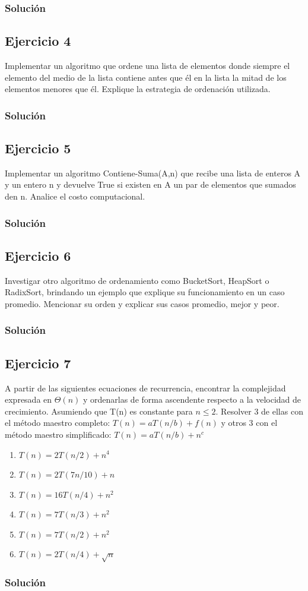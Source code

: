 \documentclass{article}
\begin{document}
\subsubsection*{Solución}


\subsection*{Ejercicio 4}
Implementar un algoritmo que ordene una lista de elementos donde siempre el elemento del medio de la lista contiene antes que él en la lista la mitad de los elementos menores que él. Explique la estrategia de ordenación utilizada.
\subsubsection*{Solución}


\subsection*{Ejercicio 5}
Implementar un algoritmo Contiene-Suma(A,n) que recibe una lista de enteros A y un entero n y devuelve True si existen en A un par de elementos que sumados den n. Analice el costo computacional.
\subsubsection*{Solución}


\subsection*{Ejercicio 6}
Investigar otro algoritmo de ordenamiento como BucketSort, HeapSort o RadixSort, brindando un ejemplo que explique su funcionamiento en un caso promedio. Mencionar su orden y explicar sus casos promedio, mejor y peor.
\subsubsection*{Solución}


\subsection*{Ejercicio 7}
A partir de las siguientes ecuaciones de recurrencia, encontrar la complejidad expresada en $\Theta (n)$ y ordenarlas de forma ascendente respecto a la velocidad de crecimiento. Asumiendo que T(n) es constante para $n \leq 2$. Resolver 3 de ellas con el método maestro completo: $T(n) = a T(n/b) + f(n)$ y otros 3 con el método maestro simplificado: $T(n) = a T(n/b) + n^c$
\begin{enumerate}[label=\alph*.]
    \item $T(n) = 2T(n/2) + n^4$
    \item $T(n) = 2T(7n/10) + n$
    \item $T(n) = 16T(n/4) + n^2$
    \item $T(n) = 7T(n/3) + n^2$
    \item $T(n) = 7T(n/2) + n^2$
    \item $T(n) = 2T(n/4) + \sqrt{n}$
\end{enumerate}
\subsubsection*{Solución}
\end{document}
